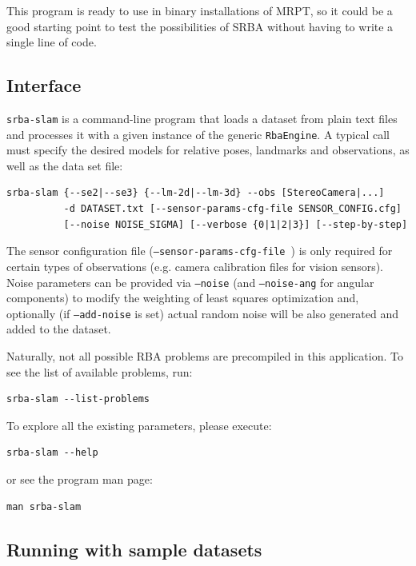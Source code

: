 \documentclass[a4paper,11pt]{article}
\begin{document}
This program is ready to use in binary installations of MRPT, so it could be a good starting 
point to test the possibilities of SRBA without having to write a single line of code.

\subsection{Interface}

\texttt{srba-slam} is a command-line program that loads a dataset from plain text files 
and processes it with a given instance of the generic \texttt{RbaEngine}. 
A typical call must specify the desired models for relative poses, landmarks 
and observations, as well as the data set file:

\begin{lstlisting}
srba-slam {--se2|--se3} {--lm-2d|--lm-3d} --obs [StereoCamera|...]
          -d DATASET.txt [--sensor-params-cfg-file SENSOR_CONFIG.cfg]
          [--noise NOISE_SIGMA] [--verbose {0|1|2|3}] [--step-by-step]
\end{lstlisting}

The sensor configuration file (\texttt{--sensor-params-cfg-file }) is
only required for certain types of observations (e.g. camera calibration files
for vision sensors). 
Noise parameters can be provided via \texttt{--noise} (and \texttt{--noise-ang} for angular components) 
to modify the weighting of least squares optimization 
and, optionally (if \texttt{--add-noise} is set) actual random noise will be also generated and added to the dataset.

Naturally, not all possible RBA problems are precompiled in this
application. To see the list of available problems, run:

\begin{lstlisting}
srba-slam --list-problems
\end{lstlisting}


To explore all the existing parameters, please execute:

\begin{lstlisting}
srba-slam --help
\end{lstlisting}

\noindent or see the program man page:

\begin{lstlisting}
man srba-slam
\end{lstlisting}


\subsection{Running with sample datasets}
\end{document}
